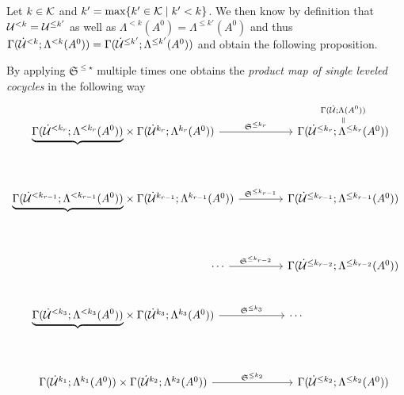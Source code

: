 Let $k\in\mathcal{K}$ and $k'=\max\{k'\in\mathcal{K}\mid k'<k\}$. We then know by definition
that $\mathcal{U}^{<k}=\mathcal{U}^{\leq k'}$ as well as
$\Lambda^{< k}(A^0)=\Lambda^{\leq k'}(A^0)$ and thus
$\Gamma(\dot{\mathcal{U}}^{< k};\Lambda^{< k}(A^0))=
\Gamma(\dot{\mathcal{U}}^{\leq k'};\Lambda^{\leq k'}(A^0))$ and obtain the following
proposition.
\begin{prop}\label{prop:theMapTau}
  By applying $\mathfrak{S}^{\leq\star}$ multiple times one obtains
  the \emph{product map of single leveled cocycles} in the following way
  \[ \begin{tikzcd}[column sep=1.4cm,row sep=.9cm]
      \underset{\tikzmark{e1}}{\underbrace{%
        \Gamma(\dot\cU^{<k_r};\Lambda^{<k_r}(A^0))}}
      \times
      \Gamma(\dot\cU^{k_r};\Lambda^{k_r}(A^0))
      \rar{\mathfrak{S}^{\leq k_r}}&
      \overset{\Gamma(\dot\cU;\Lambda(A^0))}{%
        \overset{\text{\rotatebox[origin=c]{-90}{$=$}}}{%
          \Gamma(\dot\cU^{\leq k_r};\Lambda^{\leq k_r}(A^0))
      }}
      \\\underset{\tikzmark{e2}}{\underbrace{%
        \Gamma(\dot\cU^{<k_{r-1}};\Lambda^{<k_{r-1}}(A^0))}}
      \times
      \Gamma(\dot\cU^{k_{r-1}};\Lambda^{k_{r-1}}(A^0))
      \rar{\mathfrak{S}^{\leq k_{r-1}}}&
      \overset{\tikzmark{n1}}{%
        \Gamma(\dot\cU^{\leq k_{r-1}};\Lambda^{\leq k_{r-1}}(A^0))}
      \\\hspace{6cm}\cdots \rar{\mathfrak{S}^{\leq k_{r-2}}}&
      \overset{\tikzmark{n2}}{%
        \Gamma(\dot\cU^{\leq k_{r-2}};\Lambda^{\leq k_{r-2}}(A^0))}
      \\\underset{\tikzmark{eEND}}{\underbrace{%
        \Gamma(\dot\cU^{<k_3};\Lambda^{<k_3}(A^0))}}
      \times
      \Gamma(\dot\cU^{k_3};\Lambda^{k_3}(A^0))
      \rar{\mathfrak{S}^{\leq k_3}}&
      \cdots\hspace{3cm}
      \\
      \Gamma(\dot\cU^{k_1};\Lambda^{k_1}(A^0))
      \times
      \Gamma(\dot\cU^{k_2};\Lambda^{k_2}(A^0))
      \rar{\mathfrak{S}^{\leq k_2}}&
      \overset{\tikzmark{nEND}}{%
        \Gamma(\dot\cU^{\leq k_2};\Lambda^{\leq k_2}(A^0))}
  \end{tikzcd} \]

\end{prop}
